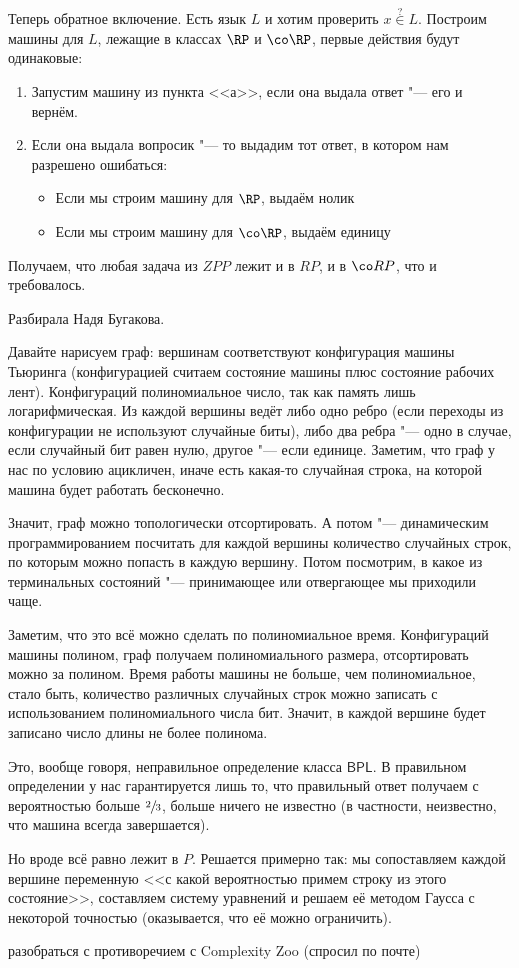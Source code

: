 	Теперь обратное включение.
	Есть язык $L$ и хотим проверить $x \stackrel{?}{\in} L$.
	Построим машины для $L$, лежащие в классах $\RP$ и $\co\RP$, первые действия будут одинаковые:
	\begin{enumerate}
		\item Запустим машину из пункта <<а>>, если она выдала ответ "--- его и вернём.
		\item Если она выдала вопросик "--- то выдадим тот ответ, в котором нам разрешено ошибаться:
			\begin{itemize}
				\item
					Если мы строим машину для $\RP$, выдаём нолик
				\item
					Если мы строим машину для $\co\RP$, выдаём единицу
			\end{itemize}
	\end{enumerate}
	Получаем, что любая задача из $ZPP$ лежит и в $RP$, и в $\co RP$, что и требовалось.

	Разбирала Надя Бугакова.

	Давайте нарисуем граф: вершинам соответствуют конфигурация машины Тьюринга (конфигурацией
	считаем состояние машины плюс состояние рабочих лент).
	Конфигураций полиномиальное число, так как память лишь логарифмическая.
	Из каждой вершины ведёт либо одно ребро (если переходы из конфигурации не используют случайные биты),
	либо два ребра "--- одно в случае, если случайный бит равен нулю, другое "--- если единице.
	Заметим, что граф у нас по условию ацикличен, иначе есть какая-то случайная строка, на которой машина будет работать бесконечно.

	Значит, граф можно топологически отсортировать.
	А потом "--- динамическим программированием посчитать для каждой вершины количество случайных строк,
	по которым можно попасть в каждую вершину.
	Потом посмотрим, в какое из терминальных состояний "--- принимающее или отвергающее мы приходили чаще.

	Заметим, что это всё можно сделать по полиномиальное время.
	Конфигураций машины полином, граф получаем полиномиального размера, отсортировать можно за полином.
	Время работы машины не больше, чем полиномиальное, стало быть, количество
	различных случайных строк можно записать с использованием полиномиального числа бит.
	Значит, в каждой вершине будет записано число длины не более полинома.

	\begin{Rem}
		Это, вообще говоря, неправильное определение класса $\mathsf{BPL}$.
		В правильном определении у нас гарантируется лишь 
		то, что правильный ответ получаем с вероятностью больше $\sfrac 23$, больше ничего не известно
		(в частности, неизвестно, что машина всегда завершается).

		Но вроде всё равно лежит в $P$.
		Решается примерно так: мы сопоставляем каждой вершине переменную <<с какой вероятностью
		примем строку из этого состояние>>, составляем систему уравнений и решаем
		её методом Гаусса с некоторой точностью (оказывается, что её можно ограничить).

		\TODO разобраться с противоречием с Complexity Zoo (спросил по почте)
	\end{Rem}

